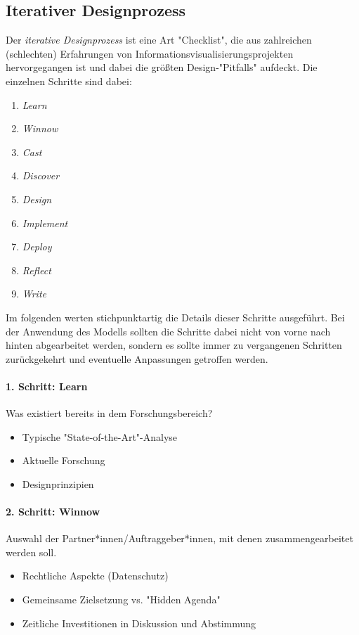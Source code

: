 		\subsection{Iterativer Designprozess}
			Der \emph{iterative Designprozess} ist eine Art "Checklist", die aus zahlreichen (schlechten) Erfahrungen von Informationsvisualisierungsprojekten hervorgegangen ist und dabei die größten Design-"Pitfalls" aufdeckt. Die einzelnen Schritte sind dabei:
			\begin{enumerate}
				\item \emph{Learn}
				\item \emph{Winnow}
				\item \emph{Cast}
				\item \emph{Discover}
				\item \emph{Design}
				\item \emph{Implement}
				\item \emph{Deploy}
				\item \emph{Reflect}
				\item \emph{Write}
			\end{enumerate}
			Im folgenden werten stichpunktartig die Details dieser Schritte ausgeführt. Bei der Anwendung des Modells sollten die Schritte dabei nicht von vorne nach hinten abgearbeitet werden, sondern es sollte immer zu vergangenen Schritten zurückgekehrt und eventuelle Anpassungen getroffen werden.

			\paragraph{1. Schritt: Learn}
			Was existiert bereits in dem Forschungsbereich?
			\begin{itemize}
				\item Typische "State-of-the-Art"-Analyse
				\item Aktuelle Forschung
				\item Designprinzipien
			\end{itemize}

			\paragraph{2. Schritt: Winnow}
			Auswahl der Partner*innen/Auftraggeber*innen, mit denen zusammengearbeitet werden soll.
			\begin{itemize}
				\item Rechtliche Aspekte (Datenschutz)
				\item Gemeinsame Zielsetzung vs. "Hidden Agenda"
				\item Zeitliche Investitionen in Diskussion und Abstimmung
			\end{itemize}

